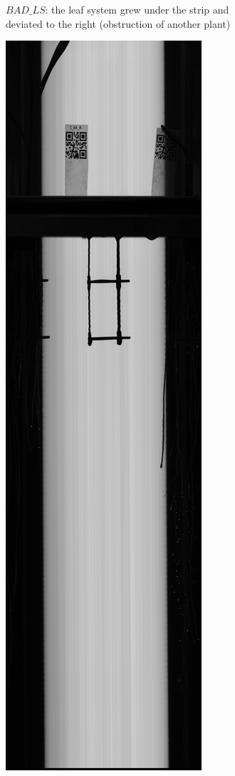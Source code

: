 \begin{figure}
\begin{subfigure}[b]{.13\textwidth}
  \caption{$BAD\_LS$: the leaf system grew under the strip and deviated to the right (obstruction of another plant)}
  \label{fig:BAD_LS}
\end{subfigure}
%
\begin{subfigure}[b]{.13\textwidth}
  \centering
  \includegraphics[width=\linewidth]{figures/NO_SEED.jpg}

\end{subfigure}
\end{figure}
